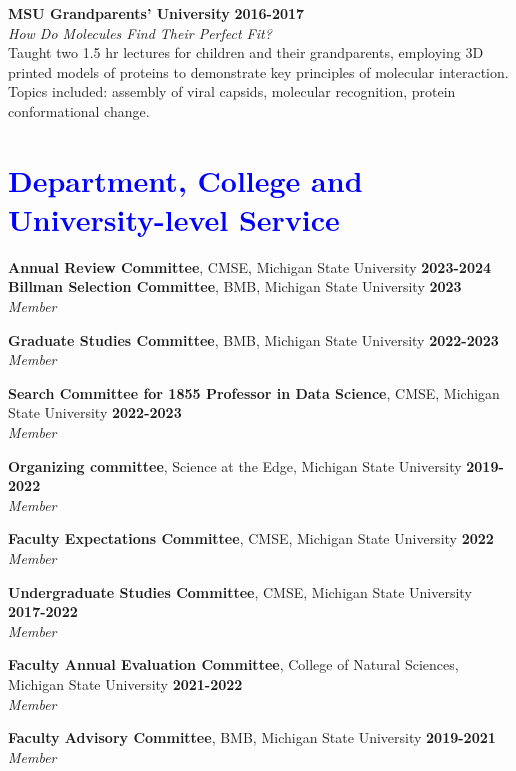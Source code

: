 \documentclass[margin,line]{res}
\begin{document}
\begin{resume}
        {\bf MSU Grandparents' University} \hfill {\bf 2016-2017} \\
        \emph{How Do Molecules Find Their Perfect Fit?}\\
        Taught two 1.5 hr lectures for children and their grandparents, employing 3D printed models of proteins to demonstrate key principles of molecular interaction.  Topics included: assembly of viral capsids, molecular recognition, protein conformational change.

\section{\sc \textcolor{blue}{ Department, College and \\ University-level Service }}

{\bf Annual Review Committee}, CMSE, Michigan State University \hfill {\bf 2023-2024}\\

{\bf Billman Selection Committee}, BMB, Michigan State University \hfill {\bf 2023}\\
        {\emph {Member}}

        {\bf Graduate Studies Committee}, BMB, Michigan State University \hfill {\bf 2022-2023}\\
        {\emph {Member}}

        {\bf Search Committee for 1855 Professor in Data Science}, CMSE, Michigan State University \hfill {\bf 2022-2023}\\
        {\emph {Member}}

        {\bf Organizing committee}, Science at the Edge, Michigan State University \hfill {\bf 2019-2022}\\
        {\emph {Member}}
        
        {\bf Faculty Expectations Committee}, CMSE, Michigan State University \hfill {\bf 2022}\\
        {\emph {Member}}
        
        {\bf Undergraduate Studies Committee}, CMSE, Michigan State University \hfill {\bf 2017-2022}\\
        {\emph {Member}}

        {\bf Faculty Annual Evaluation Committee}, College of Natural Sciences, Michigan State University \hfill {\bf 2021-2022}\\
        {\emph {Member}}

        {\bf Faculty Advisory Committee}, BMB, Michigan State University \hfill {\bf 2019-2021}\\
        {\emph {Member}}


\end{resume}
\end{document}
